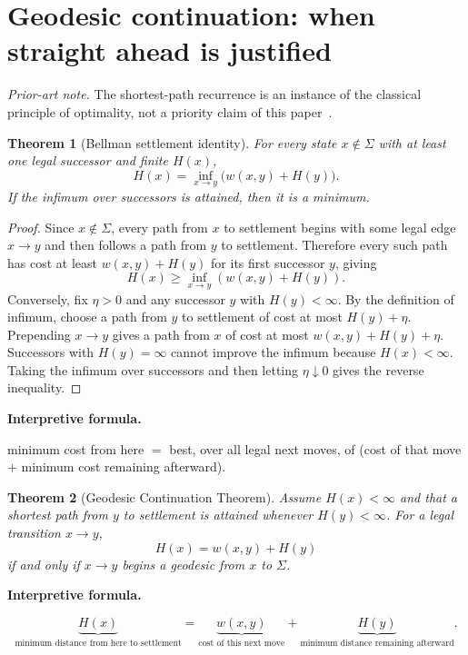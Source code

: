 \documentclass[11pt]{article}
\newtheorem{theorem}{Theorem}[section]
\theoremstyle{definition}
\theoremstyle{remark}
\newcommand{\Sett}{\Sigma}
\newenvironment{interpretiveformula}{%
  \begin{center}\begin{minipage}{0.92\linewidth}\small
  \textbf{Interpretive formula.}\ \raggedright}{\end{minipage}\end{center}}
\begin{document}
\section{Geodesic continuation: when straight ahead is justified}
\noindent\textit{Prior-art note.} The shortest-path recurrence is an instance of the classical principle of optimality, not a priority claim of this paper~\cite{bellman,astar}.


\begin{theorem}[Bellman settlement identity]
For every state $x\notin\Sett$ with at least one legal successor and finite $H(x)$,
\[
H(x)=\inf_{x\to y}\bigl(w(x,y)+H(y)\bigr).
\]
If the infimum over successors is attained, then it is a minimum.
\end{theorem}

\begin{proof}
Since $x\notin\Sett$, every path from $x$ to settlement begins with some legal edge $x\to y$ and then follows a path from $y$ to settlement. Therefore every such path has cost at least $w(x,y)+H(y)$ for its first successor $y$, giving
\[
H(x)\ge \inf_{x\to y}(w(x,y)+H(y)).
\]
Conversely, fix $\eta>0$ and any successor $y$ with $H(y)<\infty$. By the definition of infimum, choose a path from $y$ to settlement of cost at most $H(y)+\eta$. Prepending $x\to y$ gives a path from $x$ of cost at most $w(x,y)+H(y)+\eta$. Successors with $H(y)=\infty$ cannot improve the infimum because $H(x)<\infty$. Taking the infimum over successors and then letting $\eta\downarrow0$ gives the reverse inequality.
\end{proof}

\begin{interpretiveformula}
minimum cost from here $=$ best, over all legal next moves, of (cost of that move $+$ minimum cost remaining afterward).
\end{interpretiveformula}

\begin{theorem}[Geodesic Continuation Theorem]\label{thm:continuation}
Assume $H(x)<\infty$ and that a shortest path from $y$ to settlement is attained whenever $H(y)<\infty$. For a legal transition $x\to y$,
\[
\boxed{H(x)=w(x,y)+H(y)}
\]
if and only if $x\to y$ begins a geodesic from $x$ to $\Sett$.
\end{theorem}

\begin{interpretiveformula}
\[
\underbrace{H(x)}_{\text{minimum distance from here to settlement}}
=
\underbrace{w(x,y)}_{\text{cost of this next move}}
+
\underbrace{H(y)}_{\text{minimum distance remaining afterward}}.
\]
\end{interpretiveformula}
\end{document}
